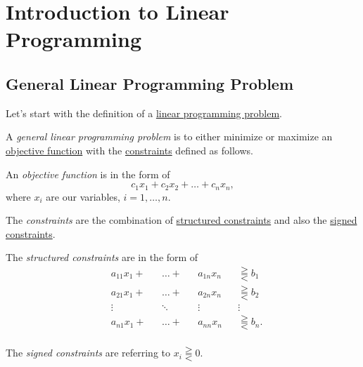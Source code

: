 \chapter{Introduction to Linear Programming}
\section{General Linear Programming Problem}
Let's start with the definition of a \hyperref[def:general-linear-programming-problem]{linear programming problem}.
\begin{definition}\label{def:general-linear-programming-problem}
	A \emph{general linear programming problem} is to either minimize or maximize an \hyperref[def:objective-function]{objective function} with the
	\hyperref[def:constraints]{constraints} defined as follows.

	\begin{definition}\label{def:objective-function}
		An \emph{objective function} is in the form of
		\[
			c_1 x_1 + c_2 x_2 + \ldots +c_n x_n,
		\]
		where \(x_{i}\) are our variables, \(i = 1, \ldots, n\).
	\end{definition}

	\begin{definition}[Constraints]\label{def:constraints}
		The \emph{constraints} are the combination of \hyperref[def:structured-constraints]{structured constraints} and also the \hyperref[def:signed-constraints]{signed constraints}.
		\begin{definition}\label{def:structured-constraints}
			The \emph{structured constraints} are in the form of
			\[
				\begin{alignedat}{4}
					&a_{11} x_1 + &&\ldots + &&a_{1n}x_n &&\gtreqqless b_1\\
					&a_{21} x_1 + &&\ldots + &&a_{2n}x_n &&\gtreqqless b_2\\
					&\vdots &&\ddots &&\vdots && \vdots \\
					&a_{n1} x_1 + &&\ldots + &&a_{nn}x_n &&\gtreqqless b_n.\\
				\end{alignedat}
			\]
		\end{definition}
		\begin{definition}\label{def:signed-constraints}
			The \emph{signed constraints} are referring to \(x_i \gtreqqless 0\).
		\end{definition}
	\end{definition}
\end{definition}

